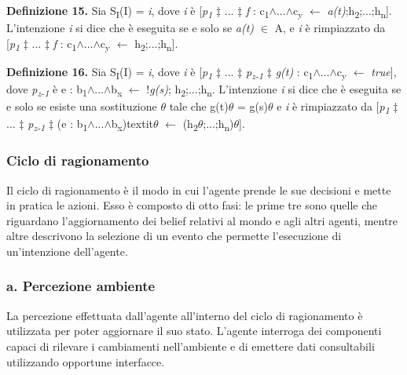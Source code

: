 \smallskip
\textbf{Definizione 15.} Sia S\textsubscript{I}(I) = \textit{i}, dove \textit{i} \`e [\textit{p\textsubscript{1}} $\ddagger$ ... $\ddagger$ \textit{f} : c\textsubscript{1}$\land$...$\land$c\textsubscript{y} $\leftarrow$ \textit{a(t)};h\textsubscript{2};...;h\textsubscript{n}]. L'intenzione \textit{i} si dice che \`e eseguita  se e solo se \textit{a(t)} $\in$ A, e \textit{i} \`e rimpiazzato da [\textit{p\textsubscript{1}} $\ddagger$ ... $\ddagger$ \textit{f} : c\textsubscript{1}$\land$...$\land$c\textsubscript{y} $\leftarrow$ h\textsubscript{2};...;h\textsubscript{n}].

\smallskip
\textbf{Definizione 16.} Sia S\textsubscript{I}(I) = \textit{i}, dove \textit{i} \`e [\textit{p\textsubscript{1}} $\ddagger$ ... $\ddagger$ \textit{p\textsubscript{z-1}} $\ddagger$ \textit{g(t)} : c\textsubscript{1}$\land$...$\land$c\textsubscript{y} $\leftarrow$ \textit{true}], dove \textit{p\textsubscript{z-1}} \`e e : b\textsubscript{1}$\land$...$\land$b\textsubscript{x} $\leftarrow$ !\textit{g(s)}; h\textsubscript{2};...;h\textsubscript{n}. L'intenzione \textit{i} si dice che \`e eseguita  se e solo se esiste una sostituzione \textit{$\theta$} tale che g(t)\textit{$\theta$} = g(s)\textit{$\theta$} e \textit{i} \`e rimpiazzato da [\textit{p\textsubscript{1}} $\ddagger$ ... $\ddagger$ \textit{p\textsubscript{z-1}} $\ddagger$ (e : b\textsubscript{1}$\land$...$\land$b\textsubscript{x})textit{$\theta$} $\leftarrow$ (h\textsubscript{2}\textit{$\theta$};...;h\textsubscript{n})\textit{$\theta$}].



\subsubsection{Ciclo di ragionamento}
Il ciclo di ragionamento \`e il modo in cui l'agente prende le sue decisioni e mette in pratica le azioni. Esso \`e composto di otto fasi: le prime tre sono quelle che riguardano l'aggiornamento dei belief relativi al mondo e agli altri agenti, mentre altre descrivono la selezione di un evento che permette l'esecuzione di un'intenzione dell'agente.

\subsubsection{a. Percezione ambiente}
La percezione effettuata dall'agente all'interno del ciclo di ragionamento \`e utilizzata per poter aggiornare il suo stato. L'agente interroga dei componenti capaci di rilevare i cambiamenti nell'ambiente e di emettere dati consultabili utilizzando opportune interfacce.

